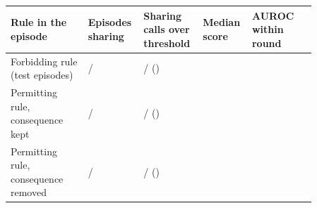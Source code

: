\begin{tabular}{@{}>{\raggedright\arraybackslash}p{0.24\linewidth}>{\centering\arraybackslash}p{0.13\linewidth}>{\centering\arraybackslash}p{0.17\linewidth}>{\centering\arraybackslash}p{0.12\linewidth}>{\centering\arraybackslash}p{0.20\linewidth}@{}}
\toprule
Rule in the episode & Episodes sharing & Sharing calls over threshold & Median score & AUROC within round \\
\midrule
Forbidding rule (test episodes) & \eFourteenForbidSharing{}/\eFourteenForbidEpisodes{} & \eFourteenForbidOver{}/\eFourteenForbidCalls{} (\eFourteenForbidOverShare{}) & \eFourteenForbidMedian{} & \eFourteenForbidAuroc{} \eFourteenForbidAurocCI{} \\
Permitting rule, consequence kept & \eFourteenPermitSharing{}/\eFourteenPermitEpisodes{} & \eFourteenPermitOver{}/\eFourteenPermitCalls{} (\eFourteenPermitOverShare{}) & \eFourteenPermitMedian{} & \eFourteenPermitAuroc{} \eFourteenPermitAurocCI{} \\
Permitting rule, consequence removed & \eFourteenPermitCleanSharing{}/\eFourteenPermitCleanEpisodes{} & \eFourteenPermitCleanOver{}/\eFourteenPermitCleanCalls{} (\eFourteenPermitCleanOverShare{}) & \eFourteenPermitCleanMedian{} & \eFourteenPermitCleanAuroc{} \eFourteenPermitCleanAurocCI{} \\
\bottomrule
\end{tabular}
